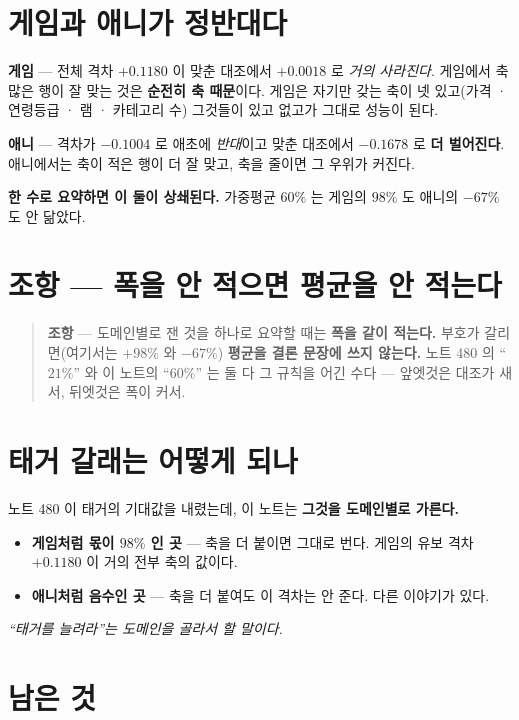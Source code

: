 \documentclass[11pt]{article}
\begin{document}
\section{게임과 애니가 정반대다}

\textbf{게임} --- 전체 격차 $+0.1180$ 이 맞춘 대조에서 $+0.0018$ 로
\emph{거의 사라진다}. 게임에서 축 많은 행이 잘 맞는 것은 \textbf{순전히
축 때문}이다. 게임은 자기만 갖는 축이 넷 있고(가격 · 연령등급 · 램 ·
카테고리 수) 그것들이 있고 없고가 그대로 성능이 된다.

\textbf{애니} --- 격차가 $-0.1004$ 로 애초에 \emph{반대}이고 맞춘
대조에서 $-0.1678$ 로 \textbf{더 벌어진다}. 애니에서는 축이 적은 행이
더 잘 맞고, 축을 줄이면 그 우위가 커진다.

\textbf{한 수로 요약하면 이 둘이 상쇄된다.} 가중평균 $60\%$ 는 게임의
$98\%$ 도 애니의 $-67\%$ 도 안 닮았다.

\section*{조항 --- 폭을 안 적으면 평균을 안 적는다}

\begin{quote}
\textbf{조항} --- 도메인별로 잰 것을 하나로 요약할 때는 \textbf{폭을 같이
적는다.} 부호가 갈리면(여기서는 $+98\%$ 와 $-67\%$) \textbf{평균을 결론
문장에 쓰지 않는다.} 노트 480 의 ``$21\%$'' 와 이 노트의 ``$60\%$'' 는
둘 다 그 규칙을 어긴 수다 --- 앞엣것은 대조가 새서, 뒤엣것은 폭이 커서.
\end{quote}

\section{태거 갈래는 어떻게 되나}

노트 480 이 태거의 기대값을 내렸는데, 이 노트는 \textbf{그것을 도메인별로
가른다.}

\begin{itemize}
\item \textbf{게임처럼 몫이 $98\%$ 인 곳} --- 축을 더 붙이면 그대로
번다. 게임의 유보 격차 $+0.1180$ 이 거의 전부 축의 값이다.
\item \textbf{애니처럼 음수인 곳} --- 축을 더 붙여도 이 격차는 안 준다.
다른 이야기가 있다.
\end{itemize}

\emph{``태거를 늘려라''는 도메인을 골라서 할 말이다.}

\section*{남은 것}
\end{document}
